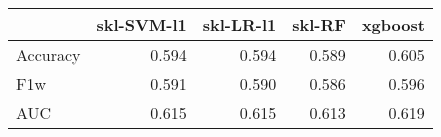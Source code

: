 \begin{tabular}{lrrrr}
\toprule
{} &  skl-SVM-l1 &  skl-LR-l1 &  skl-RF &  xgboost \\
\midrule
Accuracy &       0.594 &      0.594 &   0.589 &    0.605 \\
F1w      &       0.591 &      0.590 &   0.586 &    0.596 \\
AUC      &       0.615 &      0.615 &   0.613 &    0.619 \\
\bottomrule
\end{tabular}
